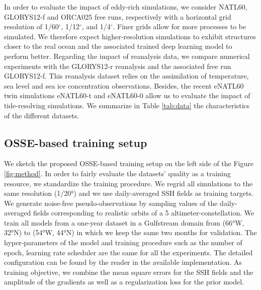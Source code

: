 \begin{bibunit}
In order to evaluate the impact of eddy-rich simulations, we consider NATL60, GLORYS12-f and ORCA025 free runs, respectively with a horizontal grid resolution of 1/60$^\circ$, 1/12$^\circ$, and 1/4$^\circ$. Finer grids allow for more processes to be simulated. We therefore expect higher-resolution simulations to exhibit structures closer to the real ocean and the associated trained deep learning model to perform better.
Regarding the impact of reanalysis data, we compare numerical experiments with the GLORYS12-r reanalysis and the associated free run GLORYS12-f. This reanalysis dataset relies on the assimilation of temperature, sea level and sea ice concentration observations. 
Besides, the recent eNATL60 twin simulations eNATL60-t and eNATL60-0 allow us to evaluate the impact of tide-resolving simulations.
We summarize in Table \ref{tab:data} the characteristics of the different datasets. 

\subsection{OSSE-based training setup}
\label{ssec:training}
We sketch the proposed OSSE-based training setup on the left side of the Figure \ref{fig:method}.
In order to fairly evaluate the datasets' quality as a training resource, we standardize the training procedure.
We regrid all simulations to the same resolution (1/20°) and we use daily-averaged SSH fields as training targets. We generate noise-free pseudo-observations by sampling values of the daily-averaged fields corresponding to realistic orbits of a 5 altimeter-constellation. We train all models from a one-year dataset in a Gulfstream domain from (66°W, 32°N) to (54°W, 44°N) in which we keep the same two months for validation. The hyper-parameters of the model and training procedure such as the number of epoch, learning rate scheduler are the same for all the experiments. The detailed configuration can be found by the reader in the available implementation. As training objective, we combine the mean square errors for the SSH fields and the amplitude of the gradients as well as a regularization loss for the prior model.


\end{bibunit}
